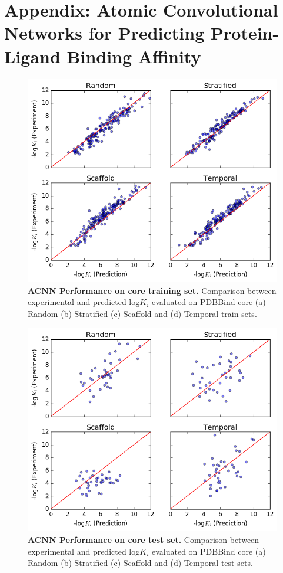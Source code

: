 \section{Appendix: Atomic Convolutional Networks for Predicting Protein-Ligand Binding Affinity}
\begin{figure}
    \centering
    \includegraphics[width=\textwidth]{Images/acnn_core_train.png}
    \caption{\textbf{ACNN Performance on core training set.} Comparison between experimental and predicted log$K_i$ evaluated on PDBBind core (a) Random (b) Stratified (c) Scaffold and (d) Temporal train sets.}
    \label{fig:acnn_core_train}
\end{figure}
\begin{figure}
    \centering
    \includegraphics[width=\textwidth]{Images/acnn_core_test.png}
    \caption{\textbf{ACNN Performance on core test set.} Comparison between experimental and predicted log$K_i$ evaluated on PDBBind core (a) Random (b) Stratified (c) Scaffold and (d) Temporal test sets.}
    \label{fig:acnn_core_test}
\end{figure}

